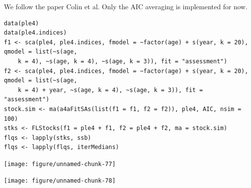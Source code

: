 \documentclass[a4paper,english,10pt]{article}\usepackage[]{graphicx}\usepackage[]{color}
\makeatletter
\newenvironment{kframe}{%
 \def\at@end@of@kframe{}%
 \ifinner\ifhmode%
  \def\at@end@of@kframe{\end{minipage}}%
  \begin{minipage}{\columnwidth}%
 \fi\fi%
 \def\FrameCommand##1{\hskip\@totalleftmargin \hskip-\fboxsep
 \colorbox{shadecolor}{##1}\hskip-\fboxsep
     \hskip-\linewidth \hskip-\@totalleftmargin \hskip\columnwidth}%
 \MakeFramed {\advance\hsize-\width
   \@totalleftmargin\z@ \linewidth\hsize
   \@setminipage}}%
 {\par\unskip\endMakeFramed%
 \at@end@of@kframe}
\newenvironment{knitrout}{}{} %
\makeatother
\begin{document}
We follow the paper Colin et al. Only the AIC averaging is implemented for now.

\begin{knitrout}
\color{fgcolor}\begin{kframe}
\begin{verbatim}
data(ple4)
data(ple4.indices)
f1 <- sca(ple4, ple4.indices, fmodel = ~factor(age) + s(year, k = 20), qmodel = list(~s(age, 
    k = 4), ~s(age, k = 4), ~s(age, k = 3)), fit = "assessment")
f2 <- sca(ple4, ple4.indices, fmodel = ~factor(age) + s(year, k = 20), qmodel = list(~s(age, 
    k = 4) + year, ~s(age, k = 4), ~s(age, k = 3)), fit = "assessment")
stock.sim <- ma(a4aFitSAs(list(f1 = f1, f2 = f2)), ple4, AIC, nsim = 100)
stks <- FLStocks(f1 = ple4 + f1, f2 = ple4 + f2, ma = stock.sim)
flqs <- lapply(stks, ssb)
flqs <- lapply(flqs, iterMedians)
\end{verbatim}
\end{kframe}
\end{knitrout}


\begin{knitrout}
\color{fgcolor}

{\centering \texttt{[image: figure/unnamed-chunk-77]} 

}



\end{knitrout}


\begin{knitrout}
\color{fgcolor}

{\centering \texttt{[image: figure/unnamed-chunk-78]} 

}



\end{knitrout}
\end{document}
